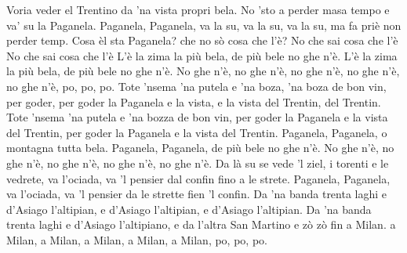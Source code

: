 \beginverse
Voria veder el Trentino
da 'na vista propri bela.
No 'sto a perder masa tempo
e va' su la Paganela.
Paganela, Paganela,
va la su, va la su, va la su,
ma fa priè non perder temp.
\endverse
\beginverse
Cosa èl sta Paganela?
che no sò cosa che l'è?
No che sai cosa che l'è
No che sai cosa che l'è
L'è la zima la più bela,
de più bele no ghe n'è.
L'è la zima la più bela,
de più bele no ghe n'è.
No ghe n'è, no ghe n'è,
no ghe n'è, no ghe n'è, no ghe n'è,
po, po, po.
\endverse
\beginverse
Tote 'nsema 'na putela
e 'na boza, 'na boza de bon vin,
per goder, per goder la Paganela
e la vista, e la vista del Trentin, del Trentin.
Tote 'nsema 'na putela
e 'na bozza de bon vin,
per goder la Paganela
e la vista del Trentin,
per goder la Paganela
e la vista del Trentin.
\endverse
\beginverse
Paganela, Paganela,
o montagna tutta bela.
Paganela, Paganela,
de più bele no ghe n'è.
No ghe n'è, no ghe n'è,
no ghe n'è, no ghe n'è, no ghe n'è.
\endverse
\beginverse
Da là su se vede 'l ziel,
i torenti e le vedrete,
va l'ociada, va 'l pensier
dal confin fino a le strete.
Paganela, Paganela,
va l'ociada, va 'l pensier
da le strette fien 'l confin.
\endverse
\beginverse
Da 'na banda trenta laghi
e d'Asiago l'altipian,
e d'Asiago l'altipian,
e d'Asiago l'altipian.
Da 'na banda trenta laghi
e d'Asiago l'altipiano,
e da l'altra San Martino
e zò zò fin a Milan.
a Milan, a Milan,
a Milan, a Milan, a Milan,
po, po, po.
\endverse
\endsong